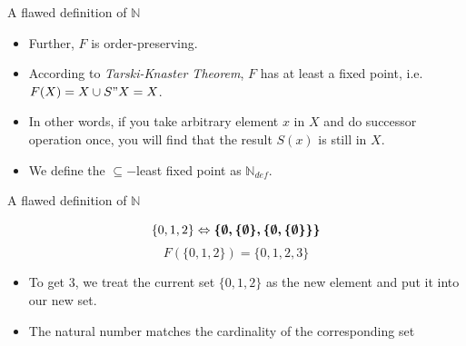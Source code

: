 \begin{frame}{A flawed definition of $\mathbb{N}$}
    \begin{itemize}
        \item Further, $F$ is order-preserving.
        \item According to \emph{Tarski-Knaster Theorem}, $F$ has at least a fixed point, i.e. $F(X)=X\cup S"X = X$.
        \item In other words, if you take arbitrary element $x$ in $X$ and do successor operation once, you will find that the result $S(x)$ is still in $X$.
        \item We define the $\subseteq-$least fixed point as $\mathbb{N}_{def}$.
    \end{itemize}
\end{frame}

\begin{frame}{A flawed definition of $\mathbb{N}$}
    \begin{example}
            $$\{0,1,2\} \Leftrightarrow \boldsymbol{\{\emptyset,\{\emptyset\}, \{\emptyset,\{\emptyset\}\}\}}$$
            $$F(\{0,1,2\})=\{0,1,2,3\}$$
    \end{example}
    \begin{itemize}
        \item To get 3, we treat the current set $\{0,1,2\}$ as the new element and put it into our new set.
    \end{itemize}
    \begin{itemize}
        \item The natural number matches the cardinality of the corresponding set
    \end{itemize}
\end{frame}

